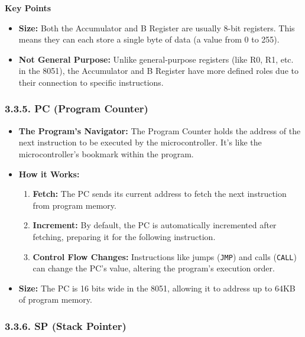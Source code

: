 \documentclass[
]{article}
\begin{document}
\textbf{Key Points}

\begin{itemize}
\item
  \textbf{Size:} Both the Accumulator and B Register are usually 8-bit
  registers. This means they can each store a single byte of data (a
  value from 0 to 255).
\item
  \textbf{Not General Purpose:} Unlike general-purpose registers (like
  R0, R1, etc. in the 8051), the Accumulator and B Register have more
  defined roles due to their connection to specific instructions.
\end{itemize}

\hypertarget{335-pc-program-counter}{%
\subsubsection{3.3.5. PC (Program
Counter)}\label{335-pc-program-counter}}

\begin{itemize}
\item
  \textbf{The Program's Navigator:} The Program Counter holds the
  address of the next instruction to be executed by the microcontroller.
  It's like the microcontroller's bookmark within the program.
\item
  \textbf{How it Works:}

  \begin{enumerate}
  \def\labelenumi{\arabic{enumi}.}
  \item
    \textbf{Fetch:} The PC sends its current address to fetch the next
    instruction from program memory.
  \item
    \textbf{Increment:} By default, the PC is automatically incremented
    after fetching, preparing it for the following instruction.
  \item
    \textbf{Control Flow Changes:} Instructions like jumps
    (\texttt{JMP}) and calls (\texttt{CALL}) can change the PC's value,
    altering the program's execution order.
  \end{enumerate}
\item
  \textbf{Size:} The PC is 16 bits wide in the 8051, allowing it to
  address up to 64KB of program memory.
\end{itemize}

\hypertarget{336-sp-stack-pointer}{%
\subsubsection{3.3.6. SP (Stack Pointer)}\label{336-sp-stack-pointer}}
\end{document}
